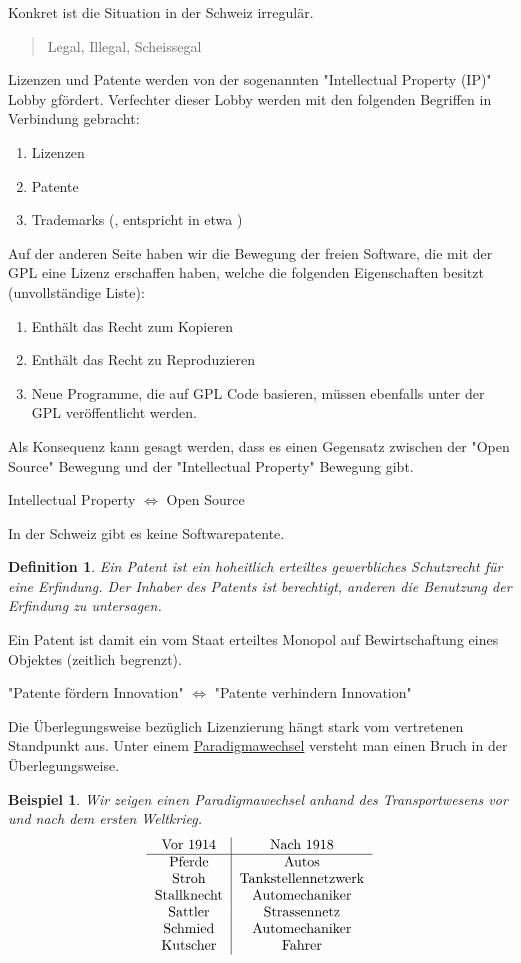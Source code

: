 \documentclass{report}
\newtheorem{mydef}{Definition}
\newtheorem{myexample}{Beispiel}
\begin{document}
Konkret ist die Situation in der Schweiz irregulär.
\begin{quote}Legal, Illegal, Scheissegal\end{quote}
Lizenzen und Patente werden von der sogenannten "Intellectual Property (IP)" Lobby gfördert. Verfechter dieser Lobby werden mit den folgenden Begriffen in Verbindung gebracht:
\begin{enumerate}
\item Lizenzen
\item Patente
\item Trademarks (\texttrademark, entspricht in etwa \textregistered [= Registrierte Marke])
\end{enumerate}
Auf der anderen Seite haben wir die Bewegung der freien Software, die mit der GPL eine Lizenz erschaffen haben, welche die folgenden Eigenschaften besitzt (unvollständige Liste):
\begin{enumerate}
\item Enthält das Recht zum Kopieren
\item Enthält das Recht zu Reproduzieren
\item Neue Programme, die auf GPL Code basieren, müssen ebenfalls unter der GPL veröffentlicht werden.
\end{enumerate}
Als Konsequenz kann gesagt werden, dass es einen Gegensatz zwischen der "Open Source" Bewegung und der "Intellectual Property" Bewegung gibt.
\begin{center}Intellectual Property $\iff$ Open Source\end{center}
In der Schweiz gibt es keine Softwarepatente.
\begin{mydef}
Ein Patent ist ein hoheitlich erteiltes gewerbliches Schutzrecht für eine Erfindung. Der Inhaber des Patents ist berechtigt, anderen die Benutzung der Erfindung zu untersagen.
\end{mydef}
Ein Patent ist damit ein vom Staat erteiltes Monopol auf Bewirtschaftung eines Objektes (zeitlich begrenzt).
\begin{center}"Patente fördern Innovation" $\iff$ "Patente verhindern Innovation"\end{center}
Die Überlegungsweise bezüglich Lizenzierung hängt stark vom vertretenen Standpunkt aus. Unter einem \underline{Paradigmawechsel} versteht man einen Bruch in der Überlegungsweise.
\begin{myexample}Wir zeigen einen Paradigmawechsel anhand des Transportwesens vor und nach dem ersten Weltkrieg.
\begin{equation}\begin{tabular}{c | c}
Vor 1914 & Nach 1918\\
\hline
Pferde & Autos \\
Stroh & Tankstellennetzwerk\\
Stallknecht & Automechaniker \\
Sattler & Strassennetz \\
Schmied & Automechaniker\\
Kutscher & Fahrer\\
\end{tabular}\end{equation}\end{myexample}
\end{document}
